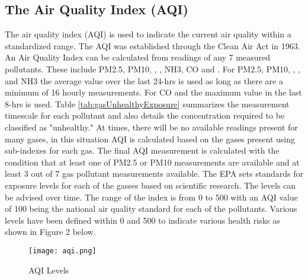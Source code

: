 \subsection{The Air Quality Index (AQI)}
The air quality index (AQI) is used to indicate the current air quality within a standardized range. The AQI was established through the Clean Air Act in 1963. An Air Quality Index can be calculated from readings of any 7 measured pollutants. These include PM2.5, PM10, \sdo, \nox, NH3, CO and \ozone. For PM2.5, PM10, \sdo, \nox, and NH3 the average value over the last 24-hrs is used as long as there are a minimum of 16 hourly measurements. For CO and \ozone the maximum value in the last 8-hrs is used. Table \ref{tab:gasUnhealthyExposure} summarizes the measurement timescale for each pollutant and also details the concentration required to be classified as "unhealthy." At times, there will be no available readings present for many gases, in this situation AQI is calculated based on the gases present using sub-indexes for each gas. The final AQI measurement is calculated with the condition that at least one of PM2.5 or PM10 measurements are available and at least 3 out of 7 gas pollutant measurements available. The EPA sets standards for exposure levels for each of the gasses based on scientific research. The levels can be advised over time. The range of the index is from 0 to 500 with an AQI value of 100 being the national air quality standard for each of the pollutants. Various levels have been defined within 0 and 500 to indicate various health risks as shown in Figure 2 below. 

\begin{figure}[h]
\centering
\texttt{[image: aqi.png]}
\caption{AQI Levels}
\label{fig:aqiLevels}
\end{figure}


